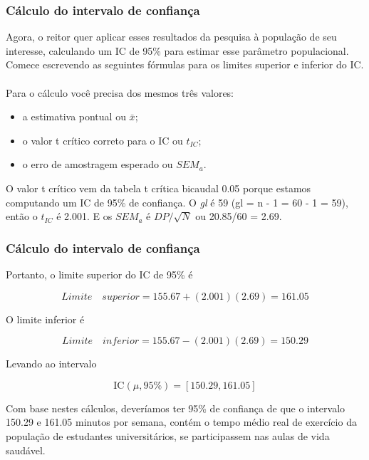 \documentclass[11pt]{beamer}
\begin{document}
\begin{frame}
\frametitle{Cálculo do intervalo de confiança}

Agora, o reitor quer aplicar esses resultados da pesquisa à população de seu interesse, calculando um IC de 95\% para estimar esse parâmetro populacional. Comece escrevendo as seguintes fórmulas para os limites superior e inferior do IC.\\~\\

Para o cálculo você precisa dos mesmos três valores: 
\begin{itemize}
\item a estimativa pontual ou $\bar{x}$;
\item o valor t crítico correto para o IC ou $t_{IC}$;
\item o erro de amostragem esperado ou $SEM_a$.
\end{itemize}

O valor t crítico vem da tabela t crítica bicaudal 0.05 porque estamos computando um IC de 95\% de confiança. O \textit{gl} é 59 (gl = n - 1 = 60 - 1 = 59), então o \(t_{IC}\) é 2.001. E os \(SEM_a\) é \(DP/\sqrt{N}\) ou 20.85/60 = 2.69.

\end{frame}

\begin{frame}
\frametitle{Cálculo do intervalo de confiança}

Portanto, o limite superior do IC de 95\% é

\[Limite\quad superior = 155.67 + (2.001)(2.69) = 161.05\]

O limite inferior é

\[Limite\quad inferior = 155.67 - (2.001)(2.69) = 150.29\]

Levando ao intervalo

\[\text{IC}(\mu, 95\%) = [150.29, 161.05]\]

Com base nestes cálculos, deveríamos ter 95\% de confiança de que o intervalo 150.29 e 161.05 minutos por semana, contém o tempo médio real de exercício da população de estudantes universitários, se participassem nas aulas de vida saudável.
\end{frame}
\end{document}
